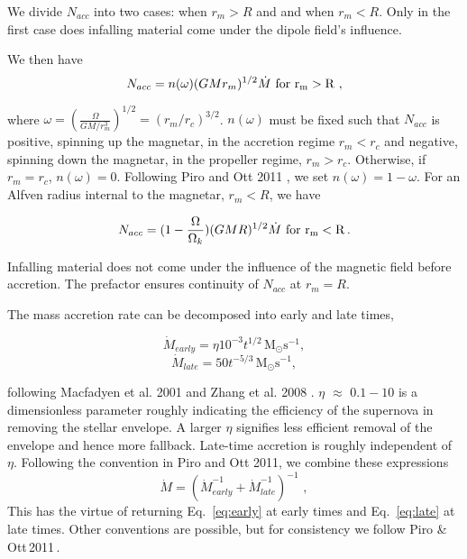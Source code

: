 \documentclass{article}
\begin{document}
We divide $N_{acc}$ into two cases: when $r_m>R$ and and when $r_m<R$. Only in the first case does infalling material come under the dipole field's influence.

We then have
\begin{equation}\label{eq:nacc1}
N_{acc}= n(\omega) (GMr_m)^{1/2} \dot{M}\, \,  \rm{for \,\, r_m>R}\,\,,
\end{equation}

where $\omega=(\frac{\Omega}{GM/r_m^3})^{1/2}=(r_m/r_c)^{3/2}$. $n(\omega)$ must be fixed such that $N_{acc}$ is positive, spinning up the magnetar, in the accretion regime $r_m<r_c$ and negative, spinning down the magnetar, in the propeller regime, $r_m>r_c$. Otherwise, if $r_m=r_c$, $n(\omega)=0$. Following Piro and Ott 2011 \cite{Piro:2011ed}, we set $n(\omega)=1-\omega$. For an Alfven radius internal to the magnetar, $r_m<R$, we have

\begin{equation}\label{eq:nacc2}
N_{acc}=(1-\frac{\Omega}{\Omega_k})(GMR)^{1/2} \dot{M}\, \,  \rm{for \,\, r_m<R}\,.
\end{equation}

Infalling material does not come under the influence of the magnetic field before accretion. The prefactor ensures continuity of $N_{acc}$ at $r_m=R$.

The mass accretion rate can be decomposed into early and late times,

\begin{equation} \label{eq:early}
\dot{M}_{early} = \eta 10^{-3}t^{1/2} \, \mathrm{M_{\odot }s^{-1}},
\end{equation}
\begin{equation} \label{eq:late}
\dot{M}_{late}=50 t^{-5/3}\, \mathrm{M_{\odot} s^{-1}},
\end{equation}

following Macfadyen et al. 2001 \cite{Macfadyen:1999mk} and Zhang et al. 2008 \cite{Zhang:2007nw}. $\eta$ $\approx$ $0.1-10$ is a dimensionless parameter roughly indicating the efficiency of the supernova in removing the stellar envelope. A larger $\eta$ signifies less efficient removal of the envelope and hence more fallback. Late-time accretion is roughly independent of $\eta$.
Following the convention in Piro and Ott 2011, we combine these expressions
\begin{equation}
\dot{M}=(\dot{M}_{early}^{-1}+\dot{M}_{late}^{-1})^{-1}\,\,,
\end{equation}
This has the virtue of returning Eq.~\ref{eq:early} at early times and Eq.~\ref{eq:late} at late times. Other conventions are possible, but for consistency we follow Piro \& Ott\,2011\,\cite{Piro:2011ed}.
\end{document}
